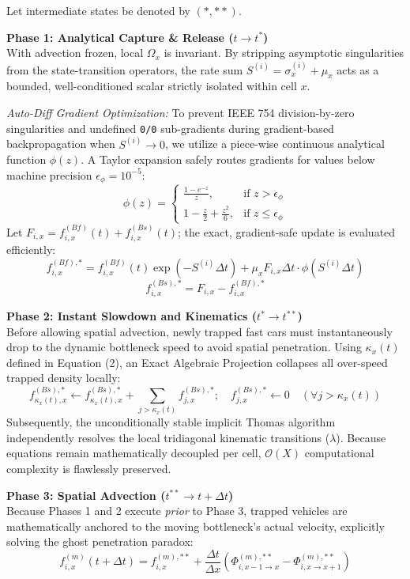 \documentclass[11pt,a4paper]{article}
\begin{document}
Let intermediate states be denoted by $(*, **)$.

\textbf{Phase 1: Analytical Capture \& Release ($t \rightarrow t^*$)} \\
With advection frozen, local $\Omega_x$ is invariant. By stripping asymptotic singularities from the state-transition operators, the rate sum $S^{(i)} = \sigma_x^{(i)} + \mu_x$ acts as a bounded, well-conditioned scalar strictly isolated within cell $x$.

\textit{Auto-Diff Gradient Optimization:} To prevent IEEE 754 division-by-zero singularities and undefined \texttt{0/0} sub-gradients during gradient-based backpropagation when $S^{(i)} \to 0$, we utilize a piece-wise continuous analytical function $\phi(z)$. A Taylor expansion safely routes gradients for values below machine precision $\epsilon_\phi = 10^{-5}$:
\begin{equation}
\phi(z) =
\begin{cases}
\frac{1 - e^{-z}}{z}, & \text{if } z > \epsilon_{\phi} \\
1 - \frac{z}{2} + \frac{z^2}{6}, & \text{if } z \le \epsilon_{\phi}
\end{cases}
\end{equation}
Let $F_{i,x} = f_{i,x}^{(Bf)}(t) + f_{i,x}^{(Bs)}(t)$; the exact, gradient-safe update is evaluated efficiently:
\begin{equation}
f_{i,x}^{(Bf), *} = f_{i,x}^{(Bf)}(t) \exp(-S^{(i)} \Delta t) + \mu_{x} F_{i,x} \Delta t \cdot \phi(S^{(i)} \Delta t)
\end{equation}
\begin{equation}
f_{i,x}^{(Bs), *} = F_{i,x} - f_{i,x}^{(Bf), *}
\end{equation}

\textbf{Phase 2: Instant Slowdown and Kinematics ($t^* \rightarrow t^{**}$)} \\
Before allowing spatial advection, newly trapped fast cars must instantaneously drop to the dynamic bottleneck speed to avoid spatial penetration. Using $\kappa_x(t)$ defined in Equation (2), an Exact Algebraic Projection collapses all over-speed trapped density locally:
\begin{equation}
f_{\kappa_x(t),x}^{(Bs), *} \leftarrow f_{\kappa_x(t),x}^{(Bs), *} + \sum_{j > \kappa_x(t)} f_{j,x}^{(Bs), *} ; \quad f_{j,x}^{(Bs), *} \leftarrow 0 \quad (\forall j > \kappa_x(t))
\end{equation}
Subsequently, the unconditionally stable implicit Thomas algorithm independently resolves the local tridiagonal kinematic transitions ($\lambda$). Because equations remain mathematically decoupled per cell, $\mathcal{O}(X)$ computational complexity is flawlessly preserved.

\textbf{Phase 3: Spatial Advection ($t^{**} \rightarrow t+\Delta t$)} \\
Because Phases 1 and 2 execute \textit{prior} to Phase 3, trapped vehicles are mathematically anchored to the moving bottleneck's actual velocity, explicitly solving the ghost penetration paradox:
\begin{equation}
f_{i,x}^{(m)}(t+\Delta t) = f_{i,x}^{(m), **} + \frac{\Delta t}{\Delta x} \left( \Phi_{i,x-1\rightarrow x}^{(m), **} - \Phi_{i,x\rightarrow x+1}^{(m), **} \right)
\end{equation}
\end{document}
